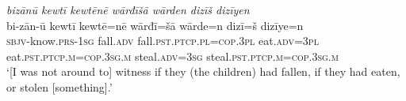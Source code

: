 \ea \label{ŽM.29}
\textit{bizānū kewtī kewtēnē wārđīšā wārden dizīš dizīyen} \\ 
\gll bi-zān-ū kewtī kewtē=nē wārđī=šā wārde=n dizī=š dizīye=n \\ 
 \textsc{sbjv-}know\textsc{.prs}\textsc{-\textsc{1sg}} fall\textsc{.adv} fall\textsc{.pst}\textsc{.ptcp}\textsc{.pl}\textsc{=cop}\textsc{.3pl} eat\textsc{.adv}\textsc{=3pl} eat\textsc{.pst}\textsc{.ptcp}\textsc{.m}\textsc{=cop}\textsc{.3sg}\textsc{.m} steal\textsc{.adv}\textsc{=3sg} steal\textsc{.pst}\textsc{.ptcp}\textsc{.m}\textsc{=cop}\textsc{.3sg}\textsc{.m} \\ 
\glt `[I was not around to] witness if they (the children) had fallen, if they had eaten, or stolen [something].'
\z 
 
